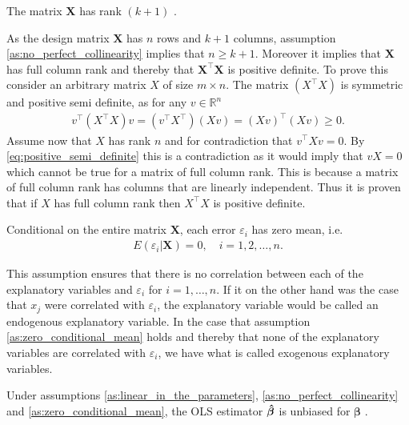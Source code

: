 \begin{assumption}\label{as:no_perfect_collinearity}
    The matrix $\mathbf{X}$ has rank $(k + 1)$ \cite[p. 810]{Wooldridge2012}.
\end{assumption}
As the design matrix $\mathbf{X}$ has $n$ rows and $k + 1$ columns, assumption \ref{as:no_perfect_collinearity} implies that $n \geq k + 1$.
Moreover it implies that $\mathbf{X}$ has full column rank and thereby that $\mathbf{X}^\top\mathbf{X}$ is positive definite.
To prove this consider an arbitrary matrix $X$ of size $m \times n$.
The matrix $(X^\top X)$ is symmetric and positive semi definite, as for any $v \in \mathbb{R}^n$
\begin{align}\label{eq:positive_semi_definite}
v^\top (X^\top X) v = (v^\top X^\top) (X v) = (X v)^\top (X v) \geq 0.
\end{align}
Assume now that $X$ has rank $n$ and for contradiction that $v^\top X v = 0$.
By \eqref{eq:positive_semi_definite} this is a contradiction as it would imply that $vX = 0$ which cannot be true for a matrix of full column rank.
This is because a matrix of full column rank has columns that are linearly independent.
Thus it is proven that if $X$ has full column rank then $X^\top X$ is positive definite.
\begin{assumption}\label{as:zero_conditional_mean}
    Conditional on the entire matrix $\mathbf{X}$, each error $\varepsilon_i$ has zero mean, i.e. \cite[p. 810]{Wooldridge2012}
    \begin{align*}
        E(\varepsilon_i | \mathbf{X}) = 0, \quad i = 1, 2, \ldots, n.
    \end{align*}
\end{assumption}
This assumption ensures that there is no correlation between each of the explanatory variables and $\varepsilon_i$ for $i = 1, \ldots, n$.
If it on the other hand was the case that $x_j$ were correlated with $\varepsilon_i$, the explanatory variable would be called an endogenous explanatory variable.
In the case that assumption \ref{as:zero_conditional_mean} holds and thereby that none of the explanatory variables are correlated with $\varepsilon_i$, we have what is called exogenous explanatory variables.
\begin{theorem}
    Under assumptions \ref{as:linear_in_the_parameters}, \ref{as:no_perfect_collinearity} and \ref{as:zero_conditional_mean}, the OLS estimator $\operatorname{\boldsymbol{\hat{\beta}}}$ is unbiased for $\boldsymbol{\beta}$ \cite[p. 810]{Wooldridge2012}.
\end{theorem}\label{th:unbiasedness_of_ols}
